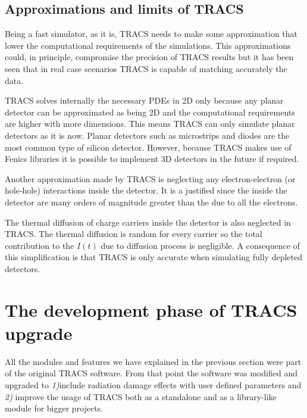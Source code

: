 \subsection{Approximations and limits of TRACS} %
\label{sec:approxTRACS}

Being a fast simulator, as it is, TRACS needs to make some approximation that lower the computational requirements of the simulations. This approximations could, in principle, compromise the precision of TRACS results but it has been seen that in real case scenarios TRACS is capable of matching accurately the data\cite{TRACSCompar}.
 
TRACS solves internally the necessary PDEs in 2D only because any planar detector can be approximated as being 2D and the computational requirements are higher with more dimensions. This means TRACS can only simulate planar detectors as it is now. Planar detectors such as microstrips and diodes are the most common type of silicon detector. However, because TRACS makes use of Fenics libraries it is possible to implement 3D detectors in the future if required.

Another approximation made by TRACS is neglecting any electron-electron (or hole-hole) interactions inside the detector. It is a justified since the  inside the detector are many orders of magnitude greater than the  due to all the electrons. 

The thermal diffusion of charge carriers inside the detector is also neglected in TRACS. The thermal diffusion is random for every carrier so the total contribution to the $I(t)$ due to diffusion process is negligible. A consequence of this simplification is that TRACS is only accurate when simulating fully depleted detectors. 

\section{The development phase of TRACS upgrade} %
\label{sec:werk}

All the modules and features we have explained in the previous section were part of the original TRACS software. From that point the software was modified and upgraded to \emph{1)}include radiation damage effects  with user defined parameters and \emph{2)} improve the usage of TRACS both as a standalone and as a library-like module for bigger projects.


